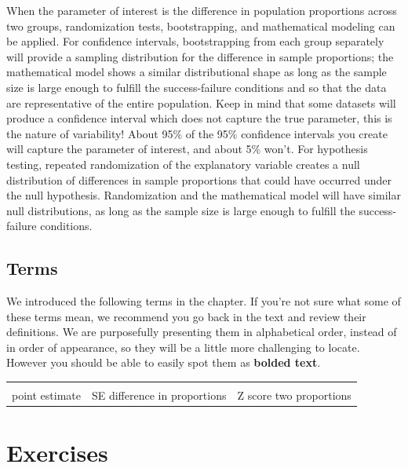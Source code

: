 \documentclass[
  10pt,
  openany]{book}
\begin{document}
When the parameter of interest is the difference in population proportions across two groups, randomization tests, bootstrapping, and mathematical modeling can be applied.
For confidence intervals, bootstrapping from each group separately will provide a sampling distribution for the difference in sample proportions; the mathematical model shows a similar distributional shape as long as the sample size is large enough to fulfill the success-failure conditions and so that the data are representative of the entire population.
Keep in mind that some datasets will produce a confidence interval which does not capture the true parameter, this is the nature of variability!
About 95\% of the 95\% confidence intervals you create will capture the parameter of interest, and about 5\% won't.
For hypothesis testing, repeated randomization of the explanatory variable creates a null distribution of differences in sample proportions that could have occurred under the null hypothesis.
Randomization and the mathematical model will have similar null distributions, as long as the sample size is large enough to fulfill the success-failure conditions.

\hypertarget{terms-10}{%
\subsection{Terms}\label{terms-10}}

We introduced the following terms in the chapter.
If you're not sure what some of these terms mean, we recommend you go back in the text and review their definitions.
We are purposefully presenting them in alphabetical order, instead of in order of appearance, so they will be a little more challenging to locate.
However you should be able to easily spot them as \textbf{bolded text}.

\begin{tabu} to 
\toprule
{} &  & \\
point estimate & SE difference in proportions & Z score two proportions\\
\bottomrule
\end{tabu}

\clearpage

\hypertarget{chp17-exercises}{%
\section{Exercises}\label{chp17-exercises}}
\end{document}
